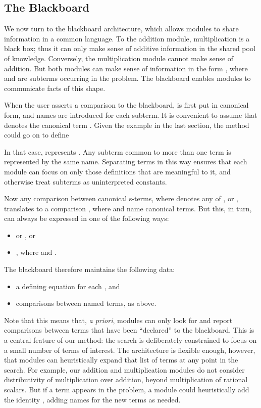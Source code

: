 \documentclass[runningheds]{llncs}
\begin{document}
\subsection{The Blackboard}
\label{subsection:blackboard}

We now turn to the blackboard architecture, which allows modules to share information in a common language. To the addition module, multiplication is a black box; thus it can only make sense of additive information in the shared pool of knowledge. Conversely, the multiplication module cannot make sense of addition. But both modules can make sense of information in the form , where  and  are subterms occurring in the problem. The blackboard enables modules to communicate facts of this shape. 

When the user asserts a comparison  to the blackboard,  is first put in canonical form, and names  are introduced for each subterm. It is convenient to assume that  denotes the canonical term . Given the example in the last section, the method could go on to define

In that case,  represents . Any subterm common to more than one term is represented by the same name. Separating terms in this way ensures that each module can focus on only those definitions that are meaningful to it, and otherwise treat subterms as uninterpreted constants.

Now any comparison  between canonical s-terms, where  denotes any of , or , translates to a comparison , where  and  name canonical terms. But this, in turn, can always be expressed in one of the following ways:
\begin{itemize}
 \item  or , or
 \item , where  and . 
\end{itemize}
The blackboard therefore maintains the following data:
\begin{itemize}
 \item a defining equation for each , and
 \item comparisons between named terms, as above.
\end{itemize}
Note that this means that, \emph{a priori}, modules can only look for and report comparisons between terms that have been ``declared'' to the blackboard. This is a central feature of our method: the search is deliberately constrained to focus on a small number of terms of interest. The architecture is flexible enough, however, that modules can heuristically expand that list of terms at any point in the search. For example, our addition and multiplication modules do not consider distributivity of multiplication over addition, beyond multiplication of rational scalars. But if a term  appears in the problem, a module could heuristically add the identity , adding names for the new terms as needed.
\end{document}
